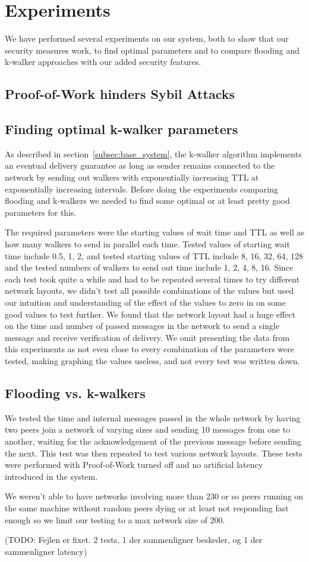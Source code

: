 \section{Experiments}
We have performed several experiments on our system, both to show that our security measures work, to find optimal parameters and to compare flooding and k-walker approaches with our added security features.

\subsection{Proof-of-Work hinders Sybil Attacks}

\subsection{Finding optimal k-walker parameters}
As described in section~\ref{subsec:base_system}, the k-walker algorithm implements an eventual delivery guarantee as long as sender remains connected to the network by sending out walkers with exponentially increasing TTL at exponentially increasing intervals. Before doing the experiments comparing flooding and k-walkers we needed to find some optimal or at least pretty good parameters for this.

The required parameters were the starting values of wait time and TTL as well as how many walkers to send in parallel each time. Tested values of starting wait time include 0.5, 1, 2, and tested starting values of TTL include 8, 16, 32, 64, 128 and the tested numbers of walkers to send out time include 1, 2, 4, 8, 16. Since each test took quite a while and had to be repeated several times to try different network layouts, we didn't test all possible combinations of the values but used our intuition and understanding of the effect of the values to zero in on some good values to test further. We found that the network layout had a huge effect on the time and number of passed messages in the network to send a single message and receive verification of delivery. We omit presenting the data from this experiments as not even close to every combination of the parameters were tested, making graphing the values useless, and not every test was written down.


\subsection{Flooding vs. k-walkers}
We tested the time and internal messages passed in the whole network by having two peers join a network of varying sizes and sending 10 messages from one to another, waiting for the acknowledgement of the previous message before sending the next. This test was then repeated to test various network layouts. These tests were performed with Proof-of-Work turned off and no artificial latency introduced in the system.

We weren't able to have networks involving more than 230 or so peers running on the same machine without random peers dying or at least not responding fast enough so we limit our testing to a max network size of 200.

(TODO: Fejlen er fixet. 2 tests, 1 der sammenligner beskeder, og 1 der sammenligner latency)
